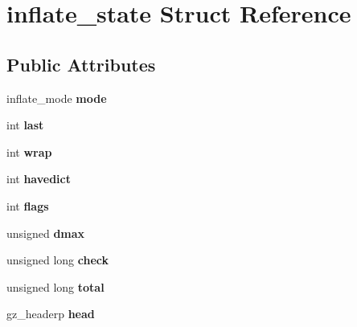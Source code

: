 \hypertarget{structinflate__state}{}\section{inflate\+\_\+state Struct Reference}
\label{structinflate__state}
\subsection*{Public Attributes}
\begin{DoxyCompactItemize}
\item 
inflate\+\_\+mode {\bfseries mode}\hypertarget{structinflate__state_a9c7906fee7eeeb450b13576531ca639d}{}\label{structinflate__state_a9c7906fee7eeeb450b13576531ca639d}

\item 
int {\bfseries last}\hypertarget{structinflate__state_ab3cbcd2c5ff3b0b8b34ef402a13afdf7}{}\label{structinflate__state_ab3cbcd2c5ff3b0b8b34ef402a13afdf7}

\item 
int {\bfseries wrap}\hypertarget{structinflate__state_a990d157b5c0d4ba178c3361de9ce6561}{}\label{structinflate__state_a990d157b5c0d4ba178c3361de9ce6561}

\item 
int {\bfseries havedict}\hypertarget{structinflate__state_a2eb1cd634ed6baade952ffa5938ebcdc}{}\label{structinflate__state_a2eb1cd634ed6baade952ffa5938ebcdc}

\item 
int {\bfseries flags}\hypertarget{structinflate__state_a9dcf6151443750d75b2283d0a3e62c39}{}\label{structinflate__state_a9dcf6151443750d75b2283d0a3e62c39}

\item 
unsigned {\bfseries dmax}\hypertarget{structinflate__state_ae3d433011714e673b22e82156acc4416}{}\label{structinflate__state_ae3d433011714e673b22e82156acc4416}

\item 
unsigned long {\bfseries check}\hypertarget{structinflate__state_ae597e4f5c37b9f7881015384bf826371}{}\label{structinflate__state_ae597e4f5c37b9f7881015384bf826371}

\item 
unsigned long {\bfseries total}\hypertarget{structinflate__state_af9d1071eb75b1ee37a151ccec8dfee95}{}\label{structinflate__state_af9d1071eb75b1ee37a151ccec8dfee95}

\item 
gz\+\_\+headerp {\bfseries head}\hypertarget{structinflate__state_aac35b33a559009eb4bc0e2bdd8e9b5c6}{}\label{structinflate__state_aac35b33a559009eb4bc0e2bdd8e9b5c6}


\end{DoxyCompactItemize}
